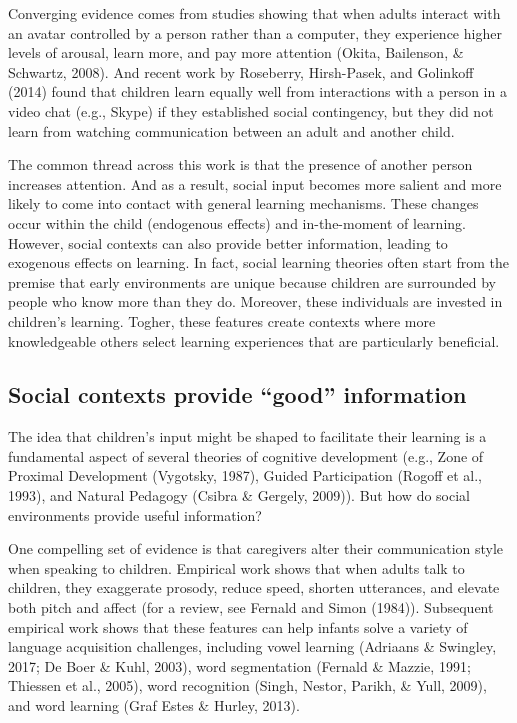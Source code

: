 \documentclass[english,floatsintext,man]{apa6}
\theoremstyle{definition}
\theoremstyle{definition}
\theoremstyle{definition}
\theoremstyle{remark}
\begin{document}
Converging evidence comes from studies showing that when adults interact
with an avatar controlled by a person rather than a computer, they
experience higher levels of arousal, learn more, and pay more attention
(Okita, Bailenson, \& Schwartz, 2008). And recent work by Roseberry,
Hirsh-Pasek, and Golinkoff (2014) found that children learn equally well
from interactions with a person in a video chat (e.g., Skype) if they
established social contingency, but they did not learn from watching
communication between an adult and another child.

The common thread across this work is that the presence of another
person increases attention. And as a result, social input becomes more
salient and more likely to come into contact with general learning
mechanisms. These changes occur within the child (endogenous effects)
and in-the-moment of learning. However, social contexts can also provide
better information, leading to exogenous effects on learning. In fact,
social learning theories often start from the premise that early
environments are unique because children are surrounded by people who
know more than they do. Moreover, these individuals are invested in
children's learning. Togher, these features create contexts where more
knowledgeable others select learning experiences that are particularly
beneficial.

\subsection{\texorpdfstring{Social contexts provide \enquote{good}
information}{Social contexts provide good information}}\label{social-contexts-provide-good-information}

The idea that children's input might be shaped to facilitate their
learning is a fundamental aspect of several theories of cognitive
development (e.g., Zone of Proximal Development (Vygotsky, 1987), Guided
Participation (Rogoff et al., 1993), and Natural Pedagogy (Csibra \&
Gergely, 2009)). But how do social environments provide useful
information?

One compelling set of evidence is that caregivers alter their
communication style when speaking to children. Empirical work shows that
when adults talk to children, they exaggerate prosody, reduce speed,
shorten utterances, and elevate both pitch and affect (for a review, see
Fernald and Simon (1984)). Subsequent empirical work shows that these
features can help infants solve a variety of language acquisition
challenges, including vowel learning (Adriaans \& Swingley, 2017; De
Boer \& Kuhl, 2003), word segmentation (Fernald \& Mazzie, 1991;
Thiessen et al., 2005), word recognition (Singh, Nestor, Parikh, \&
Yull, 2009), and word learning (Graf Estes \& Hurley, 2013).
\end{document}
